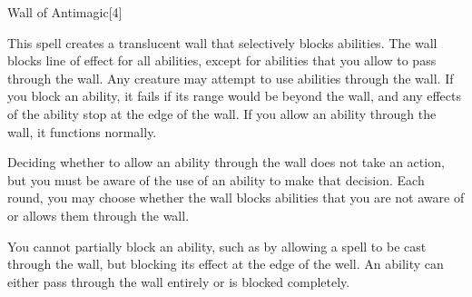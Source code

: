 \begin{spellsection}{Wall of Antimagic}[4]
    \begin{spellheader}
    \end{spellheader}
    \begin{spellcontent}
        \begin{spelltargetinginfo}
        \end{spelltargetinginfo}
        \begin{spelleffects}
            \spelleffect This spell creates a translucent wall that selectively blocks abilities.
            The wall blocks line of effect for all  abilities, except for abilities that you allow to pass through the wall.
            Any creature may attempt to use abilities through the wall.
            If you block an ability, it fails if its range would be beyond the wall, and any effects of the ability stop at the edge of the wall.
            If you allow an ability through the wall, it functions normally.

            Deciding whether to allow an ability through the wall does not take an action, but you must be aware of the use of an ability to make that decision.
            Each round, you may choose whether the wall blocks abilities that you are not aware of or allows them through the wall.
        \end{spelleffects}
    \end{spellcontent}
    \begin{spellfooter}
        \spellnotes You cannot partially block an ability, such as by allowing a  spell to be cast through the wall, but blocking its effect at the edge of the well.
        An ability can either pass through the wall entirely or is blocked completely.
        \miscastexplode
    \end{spellfooter}
    \begin{spellaugments}
    \end{spellaugments}
\end{spellsection}

